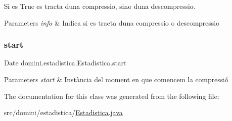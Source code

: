 Si es True es tracta d\textquotesingle{}una compressio, sino d\textquotesingle{}una descompressio. 


\begin{DoxyParams}{Parameters}
{\em info} & Indica si es tracta d\textquotesingle{}una compressio o descompressio \\
\hline
\end{DoxyParams}
\mbox{\label{classdomini_1_1estadistica_1_1Estadistica_aee0ae604272563ceab4e61392cbd343e}} 
\subsubsection{\texorpdfstring{start}{start}}
{\footnotesize\ttfamily Date domini.\+estadistica.\+Estadistica.\+start\hspace{0.3cm}{\ttfamily [private]}}


\begin{DoxyParams}{Parameters}
{\em start} & Instància del moment en que comencem la compressió \\
\hline
\end{DoxyParams}


The documentation for this class was generated from the following file\+:\begin{DoxyCompactItemize}
\item 
src/domini/estadistica/\hyperlink{Estadistica_8java}{Estadistica.\+java}\end{DoxyCompactItemize}
